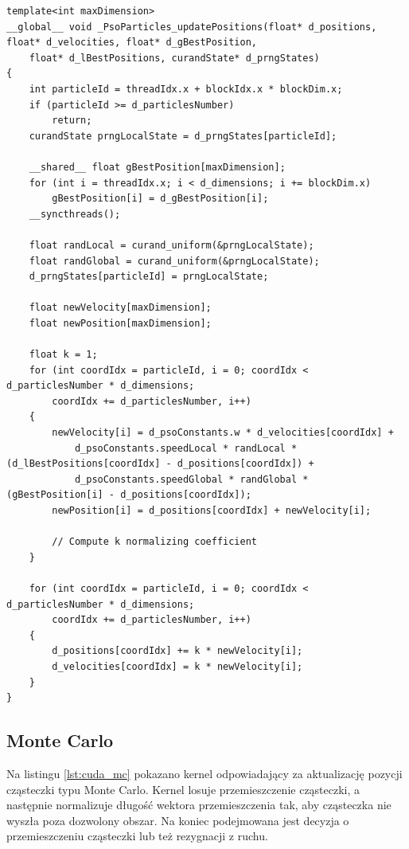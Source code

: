 \documentclass[11pt, a4paper, oneside]{article}
\begin{document}
\begin{lstlisting}[style=mycpp, label=lst:cuda_pso, caption={Kernel CUDA aktualizujący cząsteczkę PSO.}]
template<int maxDimension>
__global__ void _PsoParticles_updatePositions(float* d_positions, float* d_velocities, float* d_gBestPosition,
	float* d_lBestPositions, curandState* d_prngStates)
{
	int particleId = threadIdx.x + blockIdx.x * blockDim.x;
	if (particleId >= d_particlesNumber)
		return;
	curandState prngLocalState = d_prngStates[particleId];

	__shared__ float gBestPosition[maxDimension];
	for (int i = threadIdx.x; i < d_dimensions; i += blockDim.x)
		gBestPosition[i] = d_gBestPosition[i];
	__syncthreads();

	float randLocal = curand_uniform(&prngLocalState);
	float randGlobal = curand_uniform(&prngLocalState);
	d_prngStates[particleId] = prngLocalState;

	float newVelocity[maxDimension];
	float newPosition[maxDimension];

	float k = 1;
	for (int coordIdx = particleId, i = 0; coordIdx < d_particlesNumber * d_dimensions;
		coordIdx += d_particlesNumber, i++)
	{
		newVelocity[i] = d_psoConstants.w * d_velocities[coordIdx] +
			d_psoConstants.speedLocal * randLocal * (d_lBestPositions[coordIdx] - d_positions[coordIdx]) +
			d_psoConstants.speedGlobal * randGlobal * (gBestPosition[i] - d_positions[coordIdx]);
		newPosition[i] = d_positions[coordIdx] + newVelocity[i];

		// Compute k normalizing coefficient
	}

	for (int coordIdx = particleId, i = 0; coordIdx < d_particlesNumber * d_dimensions;
		coordIdx += d_particlesNumber, i++)
	{
		d_positions[coordIdx] += k * newVelocity[i];
		d_velocities[coordIdx] = k * newVelocity[i];
	}
}
\end{lstlisting}

\subsection{Monte Carlo}
Na listingu \ref{lst:cuda_mc} pokazano kernel odpowiadający za aktualizację pozycji cząsteczki typu Monte Carlo. Kernel losuje przemieszczenie cząsteczki, a następnie normalizuje długość wektora przemieszczenia tak, aby cząsteczka nie wyszła poza dozwolony obszar. Na koniec podejmowana jest decyzja o przemieszczeniu cząsteczki lub też rezygnacji z ruchu.
\end{document}
